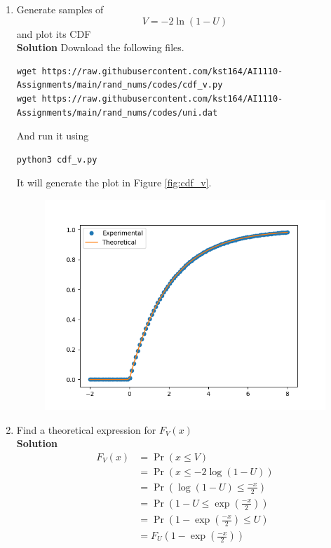 \documentclass[journal, 12pt, twocolumn]{IEEEtran}
\providecommand{\pr}[1]{\ensuremath{\Pr\left(#1\right)}}
\begin{document}
\begin{enumerate}[label=\arabic{section}.\arabic*]
    \item
        Generate samples of
        \begin{equation}
            V = -2 \ln(1 - U)
        \end{equation}
        and plot its CDF
        \\
        \textbf{Solution} Download the following files.
        \begin{lstlisting}
wget https://raw.githubusercontent.com/kst164/AI1110-Assignments/main/rand_nums/codes/cdf_v.py
wget https://raw.githubusercontent.com/kst164/AI1110-Assignments/main/rand_nums/codes/uni.dat
        \end{lstlisting}
        And run it using
        \begin{lstlisting}
python3 cdf_v.py
        \end{lstlisting}
        It will generate the plot in Figure \eqref{fig:cdf_v}.
        \begin{figure}[!ht]
            \includegraphics[width=\columnwidth]{figs/cdf_v.png}
            \caption{}
            \label{fig:cdf_v}
        \end{figure}

    \item
        Find a theoretical expression for $F_V(x)$
        \\
        \textbf{Solution}
        \begin{align}
            F_V(x) &= \pr{x \leq V} \\
            &= \pr{x \leq -2 \log (1 - U)} \\
            &= \pr{\log (1 - U) \leq \frac{-x}{2}} \\
            &= \pr{1 - U \leq \exp \left(\frac{-x}{2}\right)} \\
            &= \pr{1 - \exp \left(\frac{-x}{2}\right) \leq U} \\
            &= F_U \left(1 - \exp \left(\frac{-x}{2}\right)\right)
        \end{align}


\end{enumerate}
\end{document}
